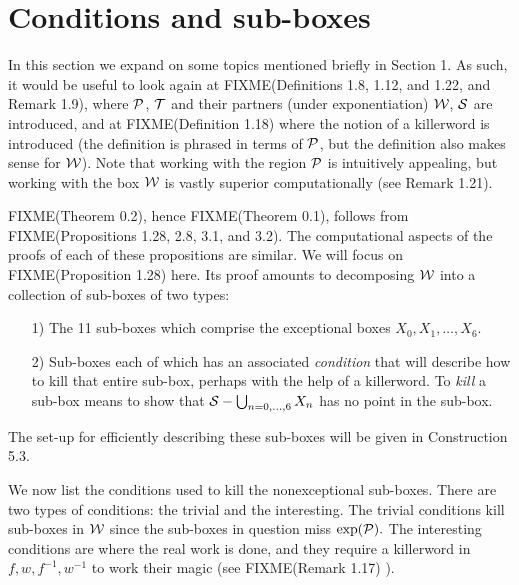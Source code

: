  
\section{Conditions and sub-boxes}
  
In this section we expand on some topics mentioned briefly in Section 1.  As such, it would be useful to look again at
FIXME(Definitions 1.8, 1.12, and 1.22, and Remark 1.9),
where ${\cal P}$, ${\cal T}$ and their partners (under exponentiation)
${\cal W}$, ${\cal S}$ are introduced, and at
FIXME(Definition 1.18)
 where the notion of a killerword is introduced (the
definition is phrased in terms of ${\cal P}$, but the definition also makes sense for ${\cal W}$).  Note that working with
the region
${\cal P}$ is intuitively appealing, but working with the box ${\cal W}$ is vastly superior computationally (see Remark
1.21).

FIXME(Theorem 0.2),
hence
FIXME(Theorem 0.1), follows from
FIXME(Propositions 1.28, 2.8, 3.1, and 3.2).
  The computational aspects of the proofs of each of these propositions are similar.  We will focus on
FIXME(Proposition 1.28)
 here.
Its proof   amounts to decomposing 
 ${\cal W}$ into a collection of sub-boxes of two types:
\begin{itemize}
\item[1)]   The 11 sub-boxes which comprise the 
exceptional boxes $X_0, X_1, \ldots, X_6.$ 

\item[2)]   Sub-boxes each of which has an associated {\it condition} that will describe how to kill that entire sub-box,
perhaps with the help of a killerword.  To {\it kill} a sub-box means to show that 
${\cal S} - \bigcup_{n = 0,\dots, 6} X_n$ has no point in the sub-box. 
\end{itemize}
\noindent The set-up for efficiently describing these sub-boxes will be given in Construction 5.3. 
 

We now list the conditions used to kill the nonexceptional sub-boxes.  There are two types of conditions: the trivial and
the interesting.  The trivial conditions kill sub-boxes in ${\cal W}$ since the sub-boxes in question miss 
$\exp({\cal P}).$  The interesting conditions are where the real work is done, and they require a killerword in $f, w,
f^{-1}, w^{-1}$ to work their magic (see
FIXME(Remark 1.17)
).

